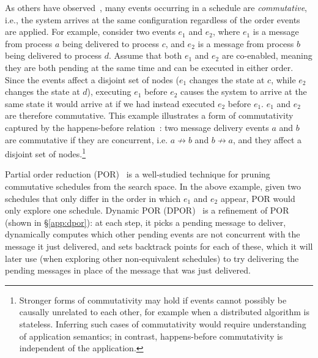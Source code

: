 As others have observed~\cite{godefroid1995partial}, many events occurring in a schedule are {\em commutative}, i.e., the system arrives at the same
configuration regardless of the order events are applied. For example, consider two events $e_1$ and $e_2$, where
$e_1$ is a message from process $a$ being delivered to
process $c$, and $e_2$ is a message from process $b$
being delivered to process $d$. Assume that both $e_1$ and $e_2$ are co-enabled, meaning they are both pending at the same time and can be executed in either order. Since
the events affect a disjoint set of nodes ($e_1$ changes the state at $c$, while $e_2$ changes the state at $d$), executing $e_1$ before $e_2$ causes the system to arrive at the same state it would arrive at if we had instead executed $e_2$ before $e_1$.
$e_1$ and $e_2$ are therefore commutative. This example
illustrates a form of commutativity captured by the happens-before relation~\cite{Lamport:1978:TCO:359545.359563}: two message delivery events
$a$ and $b$ are commutative if they are concurrent, i.e. $a \not\rightarrow b$
and $b \not\rightarrow a$, and they affect a disjoint set of nodes.\footnote{
Stronger forms of
commutativity may hold if events cannot possibly be causally unrelated to each other, for
example when a distributed algorithm is stateless. Inferring such cases of
commutativity would require understanding of application semantics; in
contrast, happens-before commutativity is independent of the application.}

Partial order reduction (POR)~\cite{godefroid1995partial,flanagan2005dynamic} is a well-studied technique for pruning commutative schedules from the search space. In the above example, given two schedules that only differ in the order
in which $e_1$ and $e_2$ appear, POR would only explore one schedule. Dynamic POR (DPOR)~\cite{flanagan2005dynamic} is a
refinement of POR (shown in \S\ref{app:dpor}): at each
step, it picks a pending message to deliver, dynamically computes which
other pending events are not concurrent with the message it just delivered,
and sets backtrack points for each of these, which it will later use (when
exploring other non-equivalent schedules) to try delivering the pending
messages in place of the message that was just delivered.


